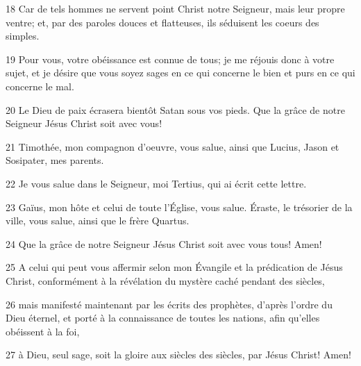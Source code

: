 \par 18 Car de tels hommes ne servent point Christ notre Seigneur, mais leur propre ventre; et, par des paroles douces et flatteuses, ils séduisent les coeurs des simples.
\par 19 Pour vous, votre obéissance est connue de tous; je me réjouis donc à votre sujet, et je désire que vous soyez sages en ce qui concerne le bien et purs en ce qui concerne le mal.
\par 20 Le Dieu de paix écrasera bientôt Satan sous vos pieds. Que la grâce de notre Seigneur Jésus Christ soit avec vous!
\par 21 Timothée, mon compagnon d'oeuvre, vous salue, ainsi que Lucius, Jason et Sosipater, mes parents.
\par 22 Je vous salue dans le Seigneur, moi Tertius, qui ai écrit cette lettre.
\par 23 Gaïus, mon hôte et celui de toute l'Église, vous salue. Éraste, le trésorier de la ville, vous salue, ainsi que le frère Quartus.
\par 24 Que la grâce de notre Seigneur Jésus Christ soit avec vous tous! Amen!
\par 25 A celui qui peut vous affermir selon mon Évangile et la prédication de Jésus Christ, conformément à la révélation du mystère caché pendant des siècles,
\par 26 mais manifesté maintenant par les écrits des prophètes, d'après l'ordre du Dieu éternel, et porté à la connaissance de toutes les nations, afin qu'elles obéissent à la foi,
\par 27 à Dieu, seul sage, soit la gloire aux siècles des siècles, par Jésus Christ! Amen!


